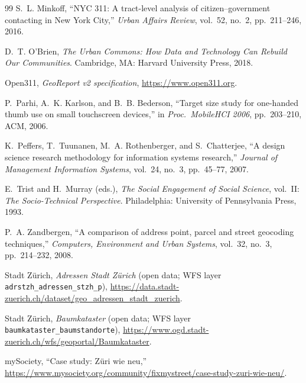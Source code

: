 \documentclass[11pt,a4paper]{article}
\begin{document}
\begin{thebibliography}{99}
 S.~L. Minkoff, ``NYC 311: A tract-level analysis of citizen--government contacting in New York City,'' \emph{Urban Affairs Review}, vol.~52, no.~2, pp.~211--246, 2016.

 D.~T. O'Brien, \emph{The Urban Commons: How Data and Technology Can Rebuild Our Communities}. Cambridge, MA: Harvard University Press, 2018.

 Open311, \emph{GeoReport v2 specification}, \url{https://www.open311.org}.

 P.~Parhi, A.~K. Karlson, and B.~B. Bederson, ``Target size study for one-handed thumb use on small touchscreen devices,'' in \emph{Proc.\ MobileHCI 2006}, pp.~203--210, ACM, 2006.

 K.~Peffers, T.~Tuunanen, M.~A. Rothenberger, and S.~Chatterjee, ``A design science research methodology for information systems research,'' \emph{Journal of Management Information Systems}, vol.~24, no.~3, pp.~45--77, 2007.

 E.~Trist and H.~Murray (eds.), \emph{The Social Engagement of Social Science}, vol.~II: \emph{The Socio-Technical Perspective}. Philadelphia: University of Pennsylvania Press, 1993.

 P.~A. Zandbergen, ``A comparison of address point, parcel and street geocoding techniques,'' \emph{Computers, Environment and Urban Systems}, vol.~32, no.~3, pp.~214--232, 2008.

 Stadt Zürich, \emph{Adressen Stadt Zürich} (open data; WFS layer \texttt{adrstzh\_adressen\_stzh\_p}), \url{https://data.stadt-zuerich.ch/dataset/geo_adressen_stadt_zuerich}.

 Stadt Zürich, \emph{Baumkataster} (open data; WFS layer \texttt{baumkataster\_baumstandorte}), \url{https://www.ogd.stadt-zuerich.ch/wfs/geoportal/Baumkataster}.

 mySociety, ``Case study: Züri wie neu,'' \url{https://www.mysociety.org/community/fixmystreet/case-study-zuri-wie-neu/}.

\end{thebibliography}
\end{document}
